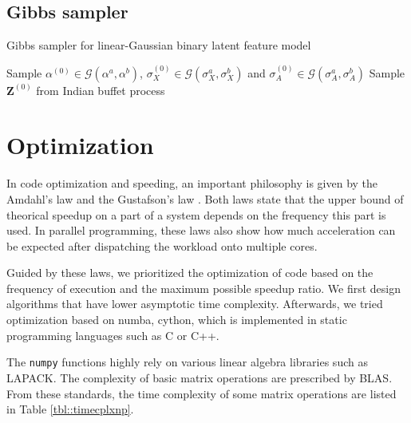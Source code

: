 \documentclass{article}
\begin{document}
\subsection{Gibbs sampler}
\begin{algorithm}
  \caption{Gibbs sampler for linear-Gaussian binary latent feature model}

  Sample $\alpha^{(0)}\in\mathcal{G}(\alpha^a,\alpha^b)$, $\sigma_X^{(0)}\in\mathcal{G}(\sigma_X^a,\sigma_X^b)$ and $\sigma_A^{(0)}\in\mathcal{G}(\sigma_A^a,\sigma_A^b)$\;
  Sample $\mathbf{Z}^{(0)}$ from Indian buffet process\;
\end{algorithm}

\section{Optimization}
In code optimization and speeding, an important philosophy is given by the Amdahl's law \citep{Amdahl10.1145/1465482.1465560} and the Gustafson's law \citep{10.1145/42411.42415}. Both laws state that the upper bound of theorical speedup on a part of a system depends on the frequency this part is used. In parallel programming, these laws also show how much acceleration can be expected after dispatching the workload onto multiple cores.

Guided by these laws, we prioritized the optimization of code based on the frequency of execution and the maximum possible speedup ratio. We first design algorithms that have lower asymptotic time complexity. Afterwards, we tried optimization based on numba, cython, which is implemented in static programming languages such as C or C++. 

The \texttt{numpy} functions highly rely on various linear algebra libraries such as LAPACK. The complexity of basic matrix operations are prescribed by BLAS. From these standards, the time complexity of some matrix operations are listed in Table \ref{tbl::timecplxnp}.
\end{document}
